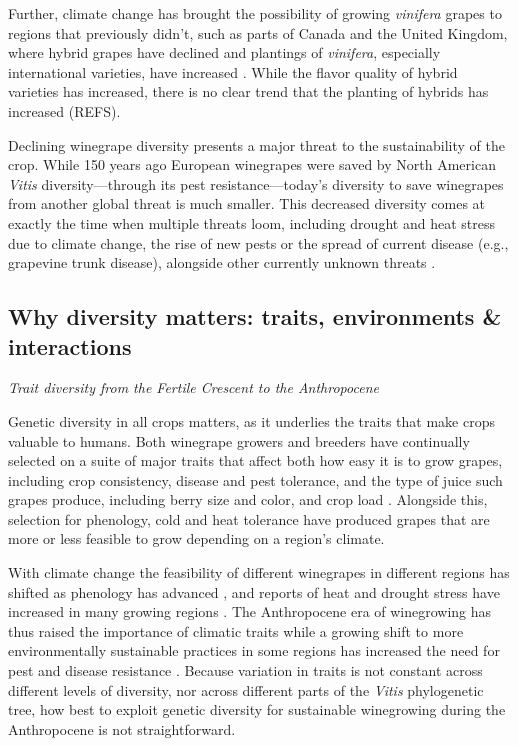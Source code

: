 \documentclass[11pt]{article}
\begin{document}
Further, climate change has brought the possibility of growing \emph{vinifera} grapes to regions that previously didn't, such as parts of Canada and the United Kingdom, where hybrid grapes have declined and plantings of \emph{vinifera}, especially international varieties, have increased \citep{Wolkovich2017}. While the flavor quality of hybrid varieties has increased, there is no clear trend that the planting of hybrids has increased (REFS). 

Declining winegrape diversity presents a major threat to the sustainability of the crop. While 150 years ago European winegrapes were saved by North American \emph{Vitis} diversity---through its pest resistance---today's diversity to save winegrapes from another global threat is much smaller. This decreased diversity comes at exactly the time when multiple threats loom, including drought and heat stress due to climate change, the rise of new pests or the spread of current disease (e.g., grapevine trunk disease), alongside other currently unknown threats \citep{Gramaje2018}. 

\subsection{Why diversity matters: traits, environments \& interactions}

\emph{Trait diversity from the Fertile Crescent to the Anthropocene}

Genetic diversity in all crops matters, as it underlies the traits that make crops valuable to humans. Both winegrape growers and breeders have continually selected on a suite of major traits that affect both how easy it is to grow grapes, including crop consistency, disease and pest tolerance, and the type of juice such grapes produce, including berry size and color, and crop load \citep{dong2023}. Alongside this, selection for phenology, cold and heat tolerance have produced grapes that are more or less feasible to grow depending on a region's climate.  

With climate change the feasibility of different winegrapes in different regions has shifted as phenology has advanced \citep{webb2012,Malheiro2013,vanlee2016oeno}, and reports of heat and drought stress have increased in many growing regions \citep{blancoward2019,diCarlo2019}. The Anthropocene era of winegrowing has thus raised the importance of climatic traits while a growing shift to more environmentally sustainable practices in some regions has increased the need for pest and disease resistance \citep{doering2019,merot2020,vanderwerf2020}. Because variation in traits is not constant across different levels of diversity, nor across different parts of the \emph{Vitis} phylogenetic tree, how best to exploit genetic diversity for sustainable winegrowing during the Anthropocene is not straightforward. 
\end{document}
